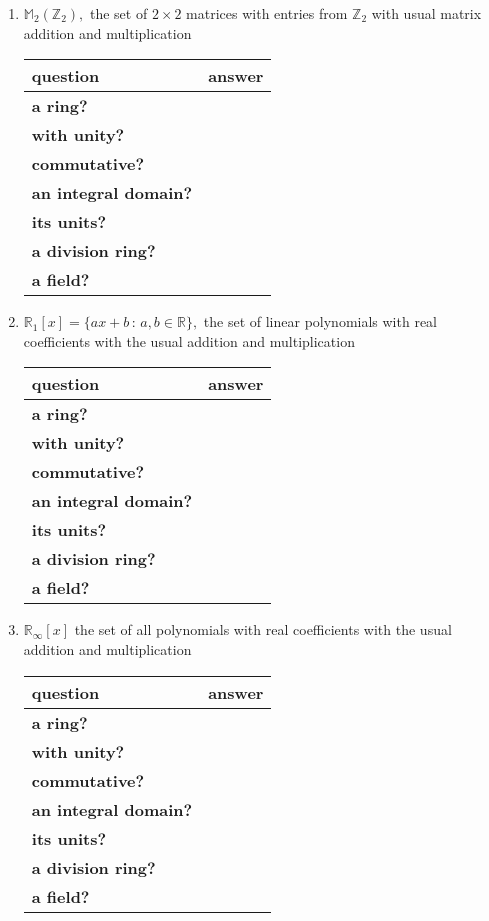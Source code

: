 \documentclass[12pt]{article}
\begin{document}
\begin{enumerate}
\begin{enumerate}
	
	\vfill
	
	
	\item $\mathbb{M}_2({\mathbb{Z}_{2}}),$ the set of $2 \times 2$ matrices with entries from $\mathbb{Z}_2$ with usual matrix addition and multiplication\\
	
	\begin{tabular}{lr}
	question&answer\\
	\hline
	\textbf{a ring?}&\\
	\textbf{with unity?}&\\
	\textbf{commutative?}&\\
	\textbf{an integral domain?}&\\
	\textbf{its units?}&\\
	\textbf{a division ring?}&\\
	\textbf{a field?}&\\
	\end{tabular}

	
	\vfill
	\item $\mathbb{R}_1[x]=\{ax+b \, : \, a,b \in \mathbb{R}\},$ the set of linear polynomials with real coefficients with the usual addition and multiplication\\
	
	\begin{tabular}{lr}
	question&answer\\
	\hline
	\textbf{a ring?}&\\
	\textbf{with unity?}&\\
	\textbf{commutative?}&\\
	\textbf{an integral domain?}&\\
	\textbf{its units?}&\\
	\textbf{a division ring?}&\\
	\textbf{a field?}&\\
	\end{tabular}

	
	\vfill

	\item $\mathbb{R}_\infty[x]$ the set of all polynomials with real coefficients with the usual addition and multiplication\\
	
	\begin{tabular}{lr}
	question&answer\\
	\hline
	\textbf{a ring?}&\\
	\textbf{with unity?}&\\
	\textbf{commutative?}&\\
	\textbf{an integral domain?}&\\
	\textbf{its units?}&\\
	\textbf{a division ring?}&\\
	\textbf{a field?}&\\
	\end{tabular}

	
	\vfill
	\end{enumerate}
	
	
\end{enumerate}
\end{document}
